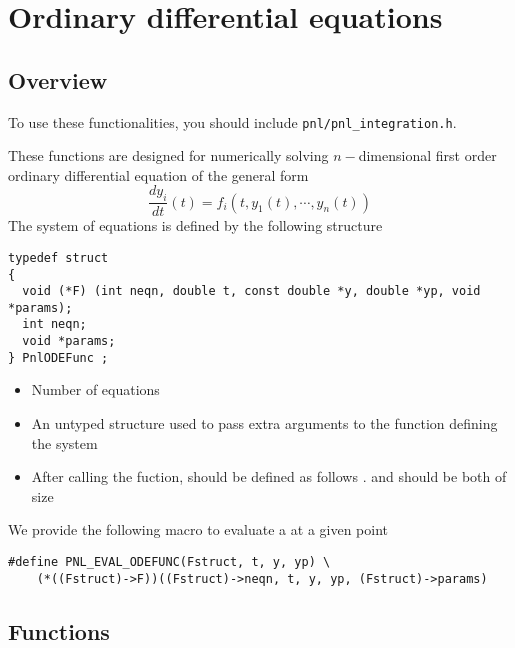 \section{Ordinary differential equations}
\subsection{Overview}

To use these functionalities, you should include \verb!pnl/pnl_integration.h!.

These functions are designed for numerically solving $n-$dimensional first order
ordinary differential equation of the general form
\begin{equation*}
  \frac{dy_i}{dt}(t) = f_i(t, y_1(t), \cdots, y_n(t)) 
\end{equation*}
The system of equations is defined by the following structure
\begin{lstlisting}
typedef struct
{
  void (*F) (int neqn, double t, const double *y, double *yp, void *params);
  int neqn; 
  void *params;
} PnlODEFunc ;
\end{lstlisting}

\begin{itemize}
\item {} 
  \sshortdescribe Number of equations
\item {} 
  \sshortdescribe An untyped structure used to pass extra
  arguments to the function  defining the system
\item {}
  \sshortdescribe After calling the fuction,  should be defined as
  follows .  and  should be
  both of size 
\end{itemize}
We provide the following macro to evaluate a 
at a given point
\begin{lstlisting}
#define PNL_EVAL_ODEFUNC(Fstruct, t, y, yp) \
    (*((Fstruct)->F))((Fstruct)->neqn, t, y, yp, (Fstruct)->params)
\end{lstlisting}

\subsection{Functions}

